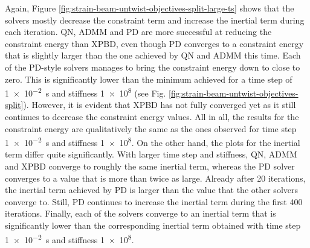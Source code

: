 Again, Figure \ref{fig:strain-beam-untwist-objectives-split-large-ts} shows that the solvers mostly decrease the constraint term and increase the inertial term during each 
iteration. QN, ADMM and PD are more successful at reducing the constraint energy than XPBD, even 
though PD converges to a constraint energy that is slightly larger than the one achieved by QN and ADMM this time. Each of the PD-style solvers manages to bring the 
constraint energy down to close to zero. This is significantly lower than the minimum achieved for a time step of \SI{1e-2}{\second} and stiffness \num{1e8} (see 
Fig. \ref{fig:strain-beam-untwist-objectives-split}). However, it is evident that XPBD has not fully converged yet as it still continues to decrease the constraint energy 
values. All in all, the results for the constraint energy are qualitatively the same as the ones observed for 
time step \SI{1e-2}{\second} and stiffness \num{1e8}. On the other hand, the plots for the inertial term differ quite significantly. With larger time step and stiffness,
QN, ADMM and XPBD converge to roughly the same inertial term, whereas the PD solver converges to a value that is more than twice as large. Already after 20 iterations, 
the inertial term achieved by PD is larger than the value that the other solvers converge to. Still, PD continues to increase the inertial term during the first 400 
iterations. Finally, each of the solvers converge to an inertial term that is significantly lower than the corresponding inertial term obtained with time step 
\SI{1e-2}{\second} and stiffness \num{1e8}.

